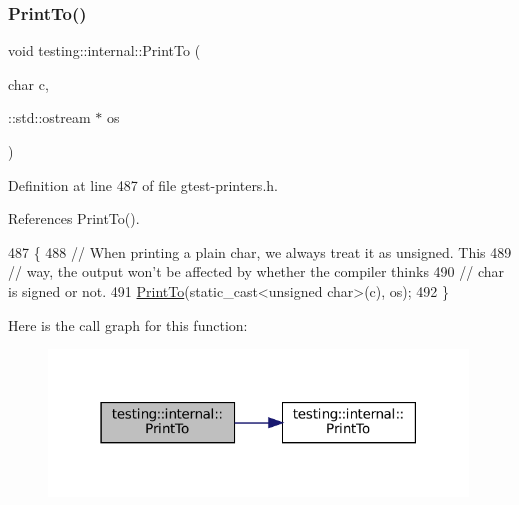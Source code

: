 \subsubsection{\texorpdfstring{Print\+To()}{PrintTo()}\hspace{0.1cm}{\footnotesize\ttfamily [7/20]}}
{\footnotesize\ttfamily void testing\+::internal\+::\+Print\+To (\begin{DoxyParamCaption}\item[{char}]{c,  }\item[{\+::std\+::ostream $\ast$}]{os }\end{DoxyParamCaption})\hspace{0.3cm}{\ttfamily [inline]}}



Definition at line 487 of file gtest-\/printers.\+h.



References Print\+To().


\begin{DoxyCode}
487                                             \{
488   \textcolor{comment}{// When printing a plain char, we always treat it as unsigned.  This}
489   \textcolor{comment}{// way, the output won't be affected by whether the compiler thinks}
490   \textcolor{comment}{// char is signed or not.}
491   \hyperlink{namespacetesting_1_1internal_af2c33928facbf2edf7af564278724d98}{PrintTo}(static\_cast<unsigned char>(c), os);
492 \}
\end{DoxyCode}
Here is the call graph for this function\+:
\nopagebreak
\begin{figure}[H]
\begin{center}
\leavevmode
\includegraphics[width=316pt]{namespacetesting_1_1internal_a476bd3d411d4f129620aaf8999c257c0_cgraph}
\end{center}
\end{figure}
\mbox{\label{namespacetesting_1_1internal_a2979ac1ad3e05c51dcd7dca2eb34e6ce}} 
